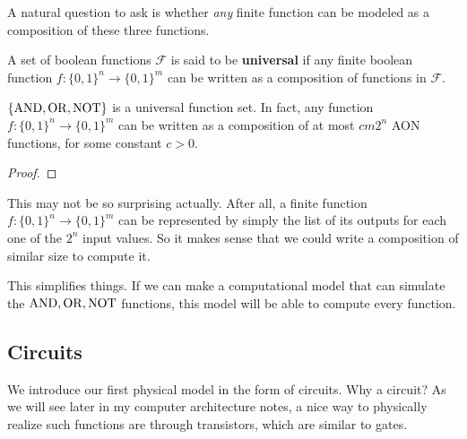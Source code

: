   A natural question to ask is whether \textit{any} finite function can be modeled as a composition of these three functions. 

  \begin{definition}
    A set of boolean functions $\mathcal{F}$ is said to be \textbf{universal} if any finite boolean function $f: \{0, 1\}^n \to \{0, 1\}^m$ can be written as a composition of functions in $\mathcal{F}$.
  \end{definition}

  \begin{theorem}
    $\{\AND, \OR, \NOT\}$ is a universal function set. In fact, any function $f: \{0,1\}^n \longrightarrow \{0,1\}^m$ can be written as a composition of at most $c m 2^n$ AON functions, for some constant $c > 0$. 
  \end{theorem}
  \begin{proof}
    
  \end{proof}

  This may not be so surprising actually. After all, a finite function $f: \{0,1\}^n \longrightarrow \{0,1\}^m$ can be represented by simply the list of its outputs for each one of the $2^n$ input values. So it makes sense that we could write a composition of similar size to compute it. 

  This simplifies things. If we can make a computational model that can simulate the $\AND, \OR, \NOT$ functions, this model will be able to compute every function. 

\subsection{Circuits}

  We introduce our first physical model in the form of circuits. Why a circuit? As we will see later in my computer architecture notes, a nice way to physically realize such functions are through transistors, which are similar to gates. 

